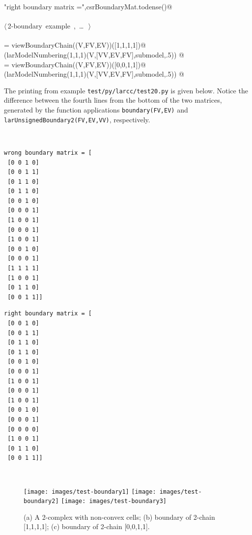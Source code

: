 \documentclass[11pt,oneside]{article}    %
\begin{document}
\begin{flushleft}
\begin{list}{}{}
\mbox{}\verb@print "right boundary matrix =",csrBoundaryMat.todense()@\\
\mbox{}\verb@@\\
\mbox{}\verb@@\hbox{$\langle\,$2-boundary example\nobreak\ {\footnotesize {}, \ldots\ }$\,\rangle$}\verb@@\\
\mbox{}\verb@@\\
\mbox{}\verb@submodel = viewBoundaryChain((V,FV,EV))([1,1,1,1])@\\
\mbox{}\verb@VIEW(larModelNumbering(1,1,1)(V,[VV,EV,FV],submodel,.5)) @\\
\mbox{}\verb@submodel = viewBoundaryChain((V,FV,EV))([0,0,1,1])@\\
\mbox{}\verb@VIEW(larModelNumbering(1,1,1)(V,[VV,EV,FV],submodel,.5)) @\\
\mbox{}\verb@@{\NWsep}
\end{list}
\vspace{-2ex}
\end{flushleft}

The printing from example \texttt{test/py/larcc/test20.py} is given below. Notice the difference between the fourth lines from the bottom of the two matrices, generated by the function applications \texttt{boundary(FV,EV)} and \texttt{larUnsignedBoundary2(FV,EV,VV)}, respectively.

\vspace{2mm}
~\hfill
\begin{minipage}[c]{0.35\textwidth}
\centering\footnotesize
\begin{verbatim}
wrong boundary matrix = [
 [0 0 1 0]
 [0 0 1 1]
 [0 1 1 0]
 [0 1 1 0]
 [0 0 1 0]
 [0 0 0 1]
 [1 0 0 1]
 [0 0 0 1]
 [1 0 0 1]
 [0 0 1 0]
 [0 0 0 1]
 [1 1 1 1]
 [1 0 0 1]
 [0 1 1 0]
 [0 0 1 1]]
\end{verbatim}
\end{minipage}
\hfill
\begin{minipage}[c]{0.35\textwidth}
\centering\footnotesize
\begin{verbatim}
right boundary matrix = [
 [0 0 1 0]
 [0 0 1 1]
 [0 1 1 0]
 [0 1 1 0]
 [0 0 1 0]
 [0 0 0 1]
 [1 0 0 1]
 [0 0 0 1]
 [1 0 0 1]
 [0 0 1 0]
 [0 0 0 1]
 [0 0 0 0]
 [1 0 0 1]
 [0 1 1 0]
 [0 0 1 1]]
\end{verbatim}
\end{minipage}
\hfill~


\begin{figure}[htbp] %
   \centering
   \texttt{[image: images/test-boundary1]} 
   \texttt{[image: images/test-boundary2]} 
   \texttt{[image: images/test-boundary3]} 
   \caption{(a) A 2-complex with non-convex cells; (b) boundary of 2-chain [1,1,1,1]; (c) boundary of 2-chain [0,0,1,1].}
   \label{fig:example}
\end{figure}
\end{document}
